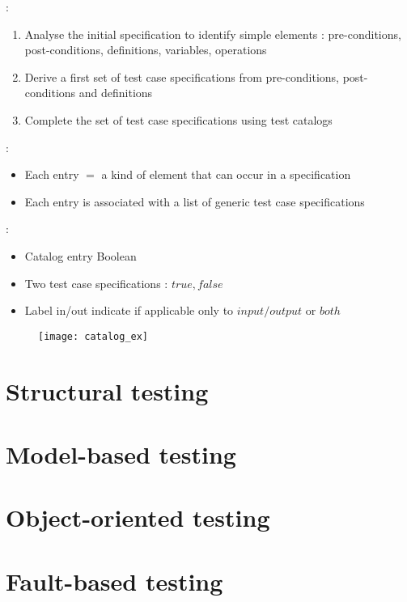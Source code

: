  :
\begin{enumerate}
    \item Analyse the initial specification to identify simple
elements : pre-conditions, post-conditions, definitions,
variables, operations
    \item Derive a first set of test case specifications from pre-conditions, post-conditions
and definitions
    \item Complete the set of test case specifications using test catalogs
\end{enumerate}


 :

\begin{itemize}
    \item Each entry $=$ a kind of element that can occur in a specification
    \item Each entry is associated with a list of generic test case specifications
\end{itemize}

 :

\begin{itemize}
    \item Catalog entry Boolean
    \item Two test case specifications : $true, false$
    \item Label in/out indicate if applicable only to $input/output$ or $both$
\end{itemize}

\begin{figure}[H]
    \centering
    \texttt{[image: catalog\_ex]}
\end{figure}

\chapter{Structural testing}

\chapter{Model-based testing}

\chapter{Object-oriented testing}

\chapter{Fault-based testing}

